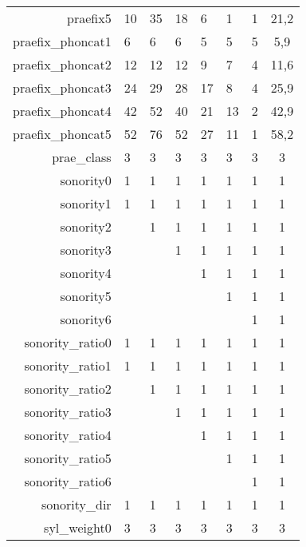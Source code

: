 \begin{longtable}{|r|llllll|c|}
    praefix5          & 10   & 35   & 18   & 6    & 1    & 1    & 21,2     \\
    praefix\_phoncat1 & 6    & 6    & 6    & 5    & 5    & 5    & 5,9      \\
    praefix\_phoncat2 & 12   & 12   & 12   & 9    & 7    & 4    & 11,6     \\
    praefix\_phoncat3 & 24   & 29   & 28   & 17   & 8    & 4    & 25,9     \\
    praefix\_phoncat4 & 42   & 52   & 40   & 21   & 13   & 2    & 42,9     \\
    praefix\_phoncat5 & 52   & 76   & 52   & 27   & 11   & 1    & 58,2     \\
    prae\_class       & 3    & 3    & 3    & 3    & 3    & 3    & 3        \\
    sonority0         & 1    & 1    & 1    & 1    & 1    & 1    & 1        \\
    sonority1         & 1    & 1    & 1    & 1    & 1    & 1    & 1        \\
    sonority2         & ~    & 1    & 1    & 1    & 1    & 1    & 1        \\
    sonority3         & ~    & ~    & 1    & 1    & 1    & 1    & 1        \\
    sonority4         & ~    & ~    & ~    & 1    & 1    & 1    & 1        \\
    sonority5         & ~    & ~    & ~    & ~    & 1    & 1    & 1        \\
    sonority6         & ~    & ~    & ~    & ~    & ~    & 1    & 1        \\
    sonority\_ratio0  & 1    & 1    & 1    & 1    & 1    & 1    & 1        \\
    sonority\_ratio1  & 1    & 1    & 1    & 1    & 1    & 1    & 1        \\
    sonority\_ratio2  & ~    & 1    & 1    & 1    & 1    & 1    & 1        \\
    sonority\_ratio3  & ~    & ~    & 1    & 1    & 1    & 1    & 1        \\
    sonority\_ratio4  & ~    & ~    & ~    & 1    & 1    & 1    & 1        \\
    sonority\_ratio5  & ~    & ~    & ~    & ~    & 1    & 1    & 1        \\
    sonority\_ratio6  & ~    & ~    & ~    & ~    & ~    & 1    & 1        \\
    sonority\_dir     & 1    & 1    & 1    & 1    & 1    & 1    & 1        \\
    syl\_weight0      & 3    & 3    & 3    & 3    & 3    & 3    & 3        \\

\end{longtable}
